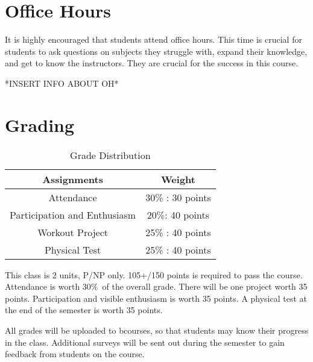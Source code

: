 \documentclass[letterpaper,12pt]{article}
\begin{document}
\section{Office Hours}
It is highly encouraged that students attend office hours. This time is crucial for students to ask questions on subjects they struggle with, expand their knowledge, and get to know the instructors. They are crucial for the success in this course.

*INSERT INFO ABOUT OH*

\section{Grading}
\begin{table}[ht]
\begin{center}
\caption{Grade Distribution}
\label{tbl:bins} %
\begin{tabular}{|cc|}
\hline
\multicolumn{1}{|c}{Assignments} & \multicolumn{1}{c|}{Weight} \\
\hline
Attendance &   30\% : 30 points \\
Participation and Enthusiasm &   20\%: 40 points \\
Workout Project &   25\% : 40 points \\
Physical Test &  25\% : 40 points \\
\hline
\end{tabular}
\end{center}
\end{table}

This class is 2 units, P/NP only. 105+/150 points is required to pass the course.   Attendance is worth 30\%\ of the overall grade. There will be one project worth 35 points. Participation and visible enthusiasm is worth 35 points. A physical test at the end of the semester is worth 35 points.

All grades will be uploaded to bcourses, so that students may know their progress in the class. Additional surveys will be sent out during the semester to gain feedback from students on the course.
\end{document}
